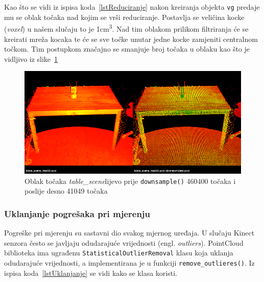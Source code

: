 Kao što se vidi iz ispisa koda~\ref{lstReduciranje} nakon kreiranja
objekta \texttt{vg} predaje mu se oblak točaka nad kojim se vrši
reduciranje. Postavlja se veličina kocke (\textit{voxel}) u našem
slučaju to je 1cm\textsuperscript{3}. Nad tim oblakom prilikom
filtriranja će se kreirati mreža kocaka te će se sve točke unutar jedne
kocke zamjeniti centralnom točkom. Tim postupkom značajno se smanjuje
broj točaka u oblaku kao što je vidljivo iz
slike~\ref{fig:tablescene-downsample}

\begin{figure}[h]
\centering
\includegraphics[scale=0.5]{figures/tablescene-downsampling-example.png}
\caption[description for List of Figures]{%
    Oblak točaka \textit{table\_scene}\footnotemark[1] lijevo prije
    \texttt{downsample()} 460400 točaka i poslije desno 41049 točaka}
\label{fig:tablescene-downsample}
\end{figure}



\newpage
\subsubsection{Uklanjanje pogrešaka pri mjerenju} %
\label{ssub:Uklanjanje pogrešaka pri mjerenju}
Pogreške pri mjerenju su sastavni dio svakog mjernog uređaja. U slučaju
Kinect senzora često se javljaju odudarajuće vrijednosti (engl.
\textit{outliers}). PointCloud biblioteka ima ugrađenu
\texttt{StatisticalOutlierRemoval} klasu koja uklanja odudarajuće
vrijednosti, a implementirana je u funkciji
\texttt{remove\_outlieres()}. Iz ispisa koda~\ref{lstUklanjanje} se
vidi kako se klasa koristi.

